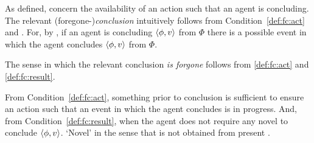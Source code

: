 \begin{note}
  As defined,  concern the availability of an action such that an agent is concluding.
  The relevant (foregone-)\emph{conclusion} intuitively follows from Condition~\ref{def:fc:act} and \assuPP{}.
  For, by \assuPP{}, if an agent is concluding \(\langle \phi, v \rangle\) from \(\Phi\) there is a possible event in which the agent concludes \(\langle \phi, v \rangle\) from \(\Phi\).

  The sense in which the relevant conclusion \emph{is forgone} follows from \ref{def:fc:act} and \ref{def:fc:result}.

  From Condition~\ref{def:fc:act}, something prior to conclusion is sufficient to ensure an action such that an event in which the agent concludes is in progress.
  And, from Condition~\ref{def:fc:result}, when the agent does not require any novel \evals{} to conclude \(\langle \phi, v \rangle\).
  `Novel' in the sense that \eval{} is not obtained from present .
\end{note}

